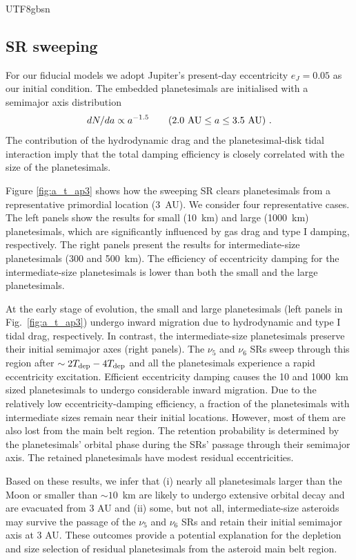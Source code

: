 \documentclass[tighten]{aastex6}
\begin{document}
\begin{CJK*}{UTF8}{gbsn}
\subsection{SR sweeping}
\label{sec:sweeping}

For our fiducial models we adopt Jupiter's present-day eccentricity 
$e_J = 0.05$ as our initial condition.  The embedded planetesimals
are initialised  with a semimajor axis distribution
%
\begin{equation}
d N/d a \propto a^{-1.5} \quad \quad (2.0~{\rm AU} \le a \le 3.5~{\rm AU}) \ .
\end{equation}
%
The contribution of the hydrodynamic drag and the planetesimal-disk tidal interaction
imply that the total damping efficiency is closely correlated with the 
size of the planetesimals. 

Figure \ref{fig:a_t_ap3} shows how the sweeping SR clears 
planetesimals from a representative primordial location (3~AU).  
We consider four representative cases. The left panels show 
the results for small (10~km) and large (1000~km) planetesimals, 
which are significantly influenced by gas drag and type I damping, 
respectively. The right panels present the results for 
intermediate-size planetesimals (300 and 500~km).  The efficiency 
of eccentricity damping for the intermediate-size planetesimals 
is lower than both the small and the large planetesimals. 
 
At the early stage of evolution, the small and large planetesimals (left
panels in Fig.~\ref{fig:a_t_ap3}) undergo inward migration due to hydrodynamic 
and type I tidal drag, respectively.  In contrast, the intermediate-size planetesimals preserve their initial semimajor 
axes (right panels).  The $\nu_5$ and $\nu_6$ SRs sweep through this
region after $\sim 2T_{\rm dep}-4T_{\rm dep}$ and all the planetesimals experience a 
rapid eccentricity excitation.  Efficient eccentricity damping 
causes the 10 and 1000~km sized planetesimals to undergo considerable 
inward migration. Due to the relatively low eccentricity-damping efficiency, 
a fraction of the planetesimals with intermediate sizes remain near their 
initial locations.  However, most of them are also lost from the main
belt region.  The retention probability is determined by the 
planetesimals' orbital phase during the SRs' passage through their 
semimajor axis. The retained planetesimals have modest residual 
eccentricities.

Based on these results, we infer that (i) nearly all planetesimals larger 
than the Moon or smaller than $\sim 10$~km are likely to undergo extensive 
orbital decay and are evacuated from 3 AU and (ii) some, but not all, 
intermediate-size asteroids may survive the passage of the $\nu_5$ and 
$\nu_6$ SRs and retain their initial semimajor axis at 3 AU.  
These outcomes provide a potential explanation for the depletion and size selection of residual planetesimals from the asteroid main belt region. 


\end{CJK*}
\end{document}
